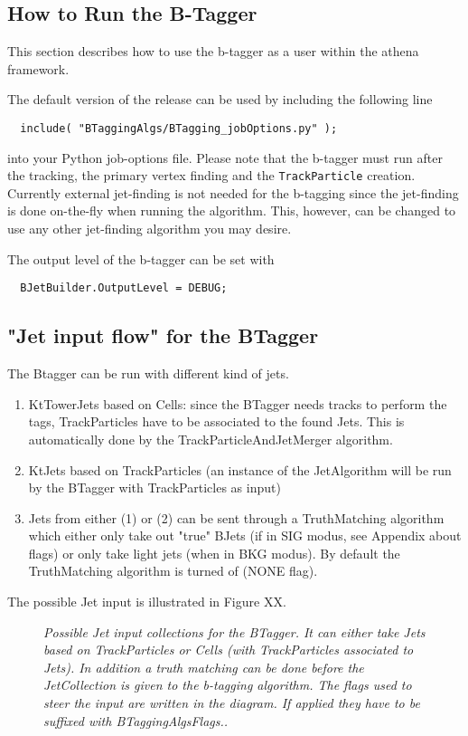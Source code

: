 \documentclass[a4paper,12pt]{article}
\begin{document}
\begin{appendix}

\section{How to Run the B-Tagger}
This section describes how to use the b-tagger as a user within the 
athena framework.

The default version of the release can be used by including the following line 
\begin{verbatim}
  include( "BTaggingAlgs/BTagging_jobOptions.py" ); 
\end{verbatim}
into your Python job-options file. Please note that the b-tagger must
run after the tracking, the primary vertex finding and the {\tt TrackParticle}
creation. Currently external jet-finding is not needed for the b-tagging
since the jet-finding is done on-the-fly when running the algorithm.
This, however, can be changed to use any other jet-finding algorithm you
may desire.   

The output level of the b-tagger can be set with
\begin{verbatim}
  BJetBuilder.OutputLevel = DEBUG;
\end{verbatim}

\subsection{"Jet input flow" for the BTagger}
The Btagger can be run with different kind of jets.
\begin{enumerate}
\item KtTowerJets based on Cells: since the BTagger needs tracks to
perform the tags, TrackParticles have to be associated to the found
Jets. This is automatically done by the TrackParticleAndJetMerger
algorithm.
\item KtJets based on TrackParticles (an instance of the JetAlgorithm
will be run by the BTagger with TrackParticles as input)
\item Jets from either (1) or (2) can be sent through a TruthMatching
algorithm which either only take out "true" BJets (if in SIG modus,
see Appendix about flags) or only take light jets (when in BKG
modus). By default the TruthMatching algorithm is turned of (NONE
flag).
\end{enumerate} 

The possible Jet input is illustrated in Figure XX.
\begin{figure}[htbp]
 \centerline{}
 \caption[]{\label{fig:jetinput}\sl Possible Jet input collections for
    the BTagger. It can either take Jets based on TrackParticles or
    Cells (with TrackParticles associated to Jets). In addition a
    truth matching can be done before the JetCollection is given to
    the b-tagging algorithm. The flags used to steer the input are
    written in the diagram. If applied they have to be suffixed with
    \textit{BTaggingAlgsFlags.}. }
\end{figure}






\end{appendix}
\end{document}
